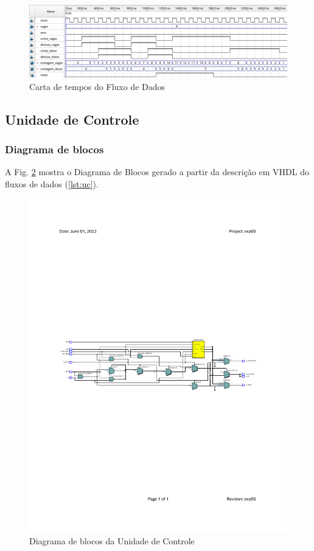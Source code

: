 \documentclass[a4,12pt]{horizon-theme}
\begin{document}
\begin{figure}[!ht]
    \centering
    \includegraphics[width=\textwidth]{fd}
    \caption{Carta de tempos do Fluxo de Dados}
    \label{fig:fd_tempos}
\end{figure}




\subsection{Unidade de Controle}
\label{sec:uc}

\subsubsection{Diagrama de blocos}
\label{sec:uc_blocos}

A Fig. \ref{fig:uc_blocos} mostra o Diagrama de Blocos gerado a partir da descrição em VHDL do fluxos de dados (\ref{lst:uc}).

\begin{figure}[!ht]
    \centering
    \includegraphics[width=\textwidth, trim={25mm, 105mm, 25mm, 105mm}, clip]{uc_blocos}
    \caption{Diagrama de blocos da Unidade de Controle}
    \label{fig:uc_blocos}
\end{figure}
\end{document}
